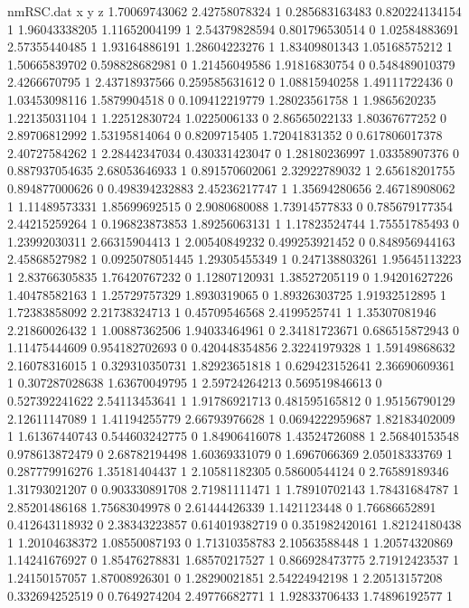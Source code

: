 \begin{filecontents}{nmRSC.dat}
x y z
1.70069743062 2.42758078324 1
0.285683163483 0.820224134154 1
1.96043338205 1.11652004199 1
2.54379828594 0.801796530514 0
1.02584883691 2.57355440485 1
1.93164886191 1.28604223276 1
1.83409801343 1.05168575212 1
1.50665839702 0.598828682981 0
1.21456049586 1.91816830754 0
0.548489010379 2.4266670795 1
2.43718937566 0.259585631612 0
1.08815940258 1.49111722436 0
1.03453098116 1.5879904518 0
0.109412219779 1.28023561758 1
1.9865620235 1.22135031104 1
1.22512830724 1.0225006133 0
2.86565022133 1.80367677252 0
2.89706812992 1.53195814064 0
0.8209715405 1.72041831352 0
0.617806017378 2.40727584262 1
2.28442347034 0.430331423047 0
1.28180236997 1.03358907376 0
0.887937054635 2.68053646933 1
0.891570602061 2.32922789032 1
2.65618201755 0.894877000626 0
0.498394232883 2.45236217747 1
1.35694280656 2.46718908062 1
1.11489573331 1.85699692515 0
2.9080680088 1.73914577833 0
0.785679177354 2.44215259264 1
0.196823873853 1.89256063131 1
1.17823524744 1.75551785493 0
1.23992030311 2.66315904413 1
2.00540849232 0.499253921452 0
0.848956944163 2.45868527982 1
0.0925078051445 1.29305455349 1
0.247138803261 1.95645113223 1
2.83766305835 1.76420767232 0
1.12807120931 1.38527205119 0
1.94201627226 1.40478582163 1
1.25729757329 1.8930319065 0
1.89326303725 1.91932512895 1
1.72383858092 2.21738324713 1
0.45709546568 2.4199525741 1
1.35307081946 2.21860026432 1
1.00887362506 1.94033464961 0
2.34181723671 0.686515872943 0
1.11475444609 0.954182702693 0
0.420448354856 2.32241979328 1
1.59149868632 2.16078316015 1
0.329310350731 1.82923651818 1
0.629423152641 2.36690609361 1
0.307287028638 1.63670049795 1
2.59724264213 0.569519846613 0
0.527392241622 2.54113453641 1
1.91786921713 0.481595165812 0
1.95156790129 2.12611147089 1
1.41194255779 2.66793976628 1
0.0694222959687 1.82183402009 1
1.61367440743 0.544603242775 0
1.84906416078 1.43524726088 1
2.56840153548 0.978613872479 0
2.68782194498 1.60369331079 0
1.6967066369 2.05018333769 1
0.287779916276 1.35181404437 1
2.10581182305 0.58600544124 0
2.76589189346 1.31793021207 0
0.903330891708 2.71981111471 1
1.78910702143 1.78431684787 1
2.85201486168 1.75683049978 0
2.61444426339 1.1421123448 0
1.76686652891 0.412643118932 0
2.38343223857 0.614019382719 0
0.351982420161 1.82124180438 1
1.20104638372 1.08550087193 0
1.71310358783 2.10563588448 1
1.20574320869 1.14241676927 0
1.85476278831 1.68570217527 1
0.866928473775 2.71912423537 1
1.24150157057 1.87008926301 0
1.28290021851 2.54224942198 1
2.20513157208 0.332694252519 0
0.7649274204 2.49776682771 1
1.92833706433 1.74896192577 1

\end{filecontents}
